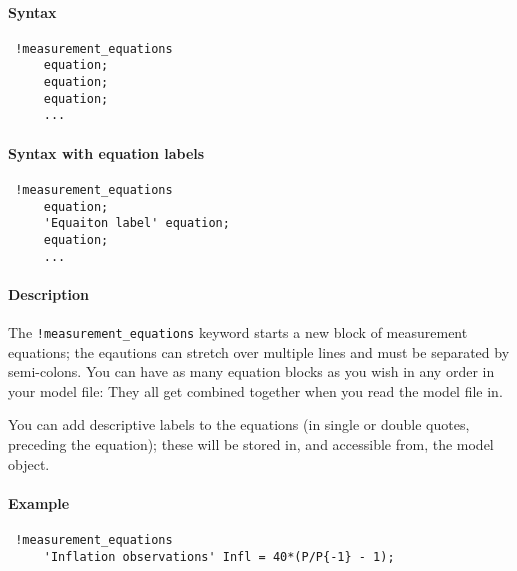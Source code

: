 


	\paragraph{Syntax}
 
 \begin{verbatim}
 !measurement_equations
     equation;
     equation;
     equation;
     ...
 \end{verbatim}
 
 \paragraph{Syntax with equation labels}
 
 \begin{verbatim}
 !measurement_equations
     equation;
     'Equaiton label' equation;
     equation;
     ...
 \end{verbatim}
 
 \paragraph{Description}
 
 The \texttt{!measurement\_equations} keyword starts a new block of
 measurement equations; the eqautions can stretch over multiple lines and
 must be separated by semi-colons. You can have as many equation blocks
 as you wish in any order in your model file: They all get combined
 together when you read the model file in.
 
 You can add descriptive labels to the equations (in single or double
 quotes, preceding the equation); these will be stored in, and accessible
 from, the model object.
 
 \paragraph{Example}
 
 \begin{verbatim}
 !measurement_equations
     'Inflation observations' Infl = 40*(P/P{-1} - 1);
 \end{verbatim}


